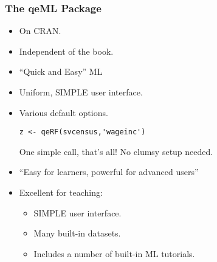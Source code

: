\documentclass{beamer}
\begin{document}
\begin{frame}[fragile] 
\frametitle{The qeML Package}
\pause

\begin{itemize}

\item On CRAN.

\item Independent of the book. 

\item ``Quick and Easy'' ML

\item Uniform, {\Large SIMPLE} user interface.  

\item Various default options.

\begin{lstlisting}
z <- qeRF(svcensus,'wageinc')
\end{lstlisting} 

One simple call, that's all!  No clumsy setup needed.

\item ``Easy for learners, powerful for advanced users''

\item Excellent for teaching:

\begin{itemize}

\item {\Large SIMPLE} user interface.

\item Many built-in datasets.

\item Includes a number of built-in ML tutorials.

\end{itemize} 

\end{itemize} 

\end{frame} 
\end{document}
